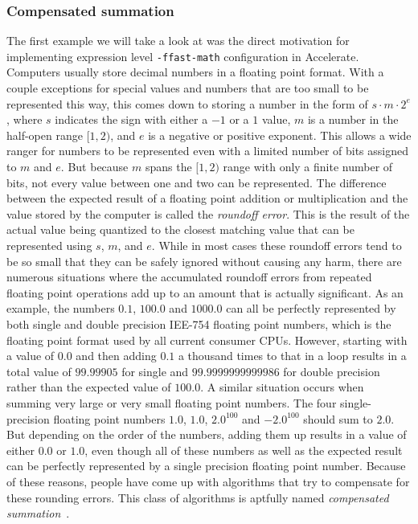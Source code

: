 \documentclass[fontsize=11pt,a4paper,parskip=half,numbers=noenddot]{scrartcl}
\begin{document}
\subsubsection{Compensated summation}

The first example we will take a look at was the direct motivation for
implementing expression level \texttt{-ffast-math} configuration in Accelerate.
Computers usually store decimal numbers in a floating point format. With a
couple exceptions for special values and numbers that are too small to be
represented this way, this comes down to storing a number in the form of
$s \cdot m \cdot 2^{e}$, where $s$ indicates the sign with either a $-1$ or a
$1$ value, $m$ is a number in the half-open range $[1, 2)$, and $e$ is a
negative or positive exponent. This allows a wide ranger for numbers to be
represented even with a limited number of bits assigned to $m$ and $e$. But
because $m$ spans the $[1, 2)$ range with only a finite number of bits, not
every value between one and two can be represented. The difference between the
expected result of a floating point addition or multiplication and the value
stored by the computer is called the \emph{roundoff error}. This is the result
of the actual value being quantized to the closest matching value that can be
represented using $s$, $m$, and $e$. While in most cases these roundoff errors
tend to be so small that they can be safely ignored without causing any harm,
there are numerous situations where the accumulated roundoff errors from
repeated floating point operations add up to an amount that is actually
significant. As an example, the numbers $0.1$, $100.0$ and $1000.0$ can all be
perfectly represented by both single and double precision IEE-754 floating point
numbers, which is the floating point format used by all current consumer CPUs.
However, starting with a value of $0.0$ and then adding $0.1$ a thousand times
to that in a loop results in a total value of $99.99905$ for single and
$99.9999999999986$ for double precision rather than the expected value of
$100.0$. A similar situation occurs when summing very large or very small
floating point numbers. The four single-precision floating point numbers $1.0$,
$1.0$, $2.0^{100}$ and $-2.0^{100}$ should sum to $2.0$. But depending on the
order of the numbers, adding them up results in a value of either $0.0$ or
$1.0$, even though all of these numbers as well as the expected result can be
perfectly represented by a single precision floating point number. Because of
these reasons, people have come up with algorithms that try to compensate for
these rounding errors. This class of algorithms is aptfully named
\emph{compensated summation}~\cite{klein2006generalized}.
\end{document}
